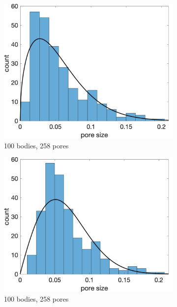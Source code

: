 \documentclass[preprint,10pt]{elsarticle}
\begin{document}
\begin{figure}[H]
\begin{subfigure}[b]{0.3\textwidth}
\includegraphics*[width =\linewidth]{./figs/hist100b_1}
\caption{100 bodies, 258 pores}
\end{subfigure}%
\begin{subfigure}[b]{0.3\textwidth}
\includegraphics*[width =\linewidth]{./figs/hist100b_46}
\caption{100 bodies, 258 pores}
\end{subfigure}%
\begin{subfigure}[b]{0.3\textwidth}

\end{subfigure}
\end{figure}
\end{document}
